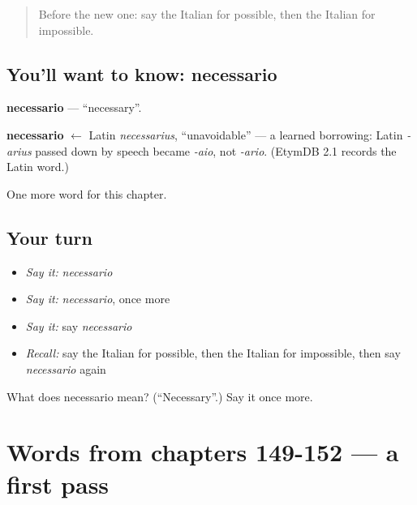 \label{lesson:IT-C157-necessario}



\begin{quote}
Before the new one: say the Italian for possible, then the Italian for impossible.
\end{quote}

\subsection*{You'll want to know: necessario}
\textbf{necessario} — \textquotedblleft{}necessary\textquotedblright{}.

\begin{cousinweb}
\textbf{necessario} $\leftarrow$ Latin \emph{necessarius}, \textquotedblleft{}unavoidable\textquotedblright{} — a learned borrowing: Latin \emph{-arius} passed down by speech became \emph{-aio}, not \emph{-ario}. (EtymDB 2.1 records the Latin word.)
\end{cousinweb}

\begin{grammarlens}[title={What you've built}]
One more word for this chapter.
\end{grammarlens}

\subsection*{Your turn}
\begin{itemize}
\raggedright
  \item \emph{Say it:} \emph{necessario}
  \item \emph{Say it:} \emph{necessario}, once more
  \item \emph{Say it:} say \emph{necessario}
  \item \emph{Recall:} say the Italian for possible, then the Italian for impossible, then say \emph{necessario} again
\end{itemize}

\begin{tcolorbox}[breakable,colback=teal!4,colframe=teal!35!black,title={Before you move on}]
What does necessario mean? (\textquotedblleft{}Necessary\textquotedblright{}.) Say it once more.
\end{tcolorbox}
\section[(dialogue)]{Words from chapters 149-152 — a first pass}

